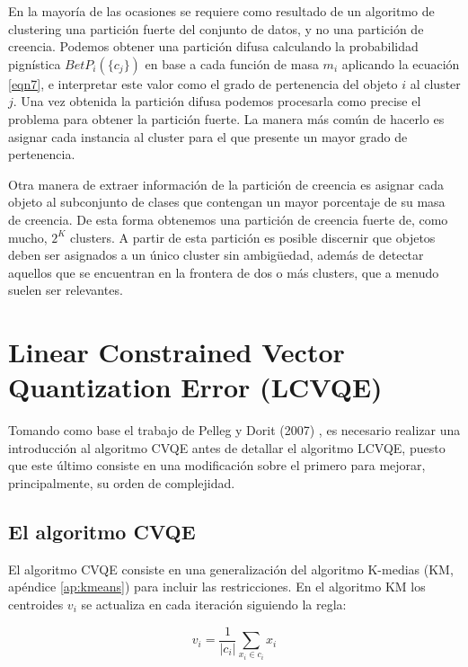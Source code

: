 En la mayoría de las ocasiones se requiere como resultado de un algoritmo de clustering una partición fuerte del conjunto de datos, y no una partición de creencia. Podemos obtener una partición difusa calculando la probabilidad pignística $BetP_i(\{c_j\})$ en base a cada función de masa $m_i$ aplicando la ecuación \ref{eqn7}, e interpretar este valor como el grado de pertenencia del objeto $i$ al cluster $j$. Una vez obtenida la partición difusa podemos procesarla como precise el problema para obtener la partición fuerte. La manera más común de hacerlo es asignar cada instancia al cluster para el que presente un mayor grado de pertenencia.

Otra manera de extraer información de la partición de creencia es asignar cada objeto al subconjunto de clases que contengan un mayor porcentaje de su masa de creencia. De esta forma obtenemos una partición de creencia fuerte de, como mucho, $2^K$ clusters. A partir de esta partición es posible discernir que objetos deben ser asignados a un único cluster sin ambigüedad, además de detectar aquellos que se encuentran en la frontera de dos o más clusters, que a menudo suelen ser relevantes.

\clearpage

\section{Linear Constrained Vector Quantization Error (LCVQE)} \label{lcvqe}

Tomando como base el trabajo de Pelleg y Dorit (2007) \cite{LCVQE:2007}, es necesario realizar una introducción al algoritmo \acf{CVQE} antes de detallar el algoritmo \acs{LCVQE}, puesto que este último consiste en una modificación sobre el primero para mejorar, principalmente, su orden de complejidad.

\subsection{El algoritmo CVQE}

El algoritmo \acs{CVQE} consiste en una generalización del algoritmo K-medias (\acs{KM}, apéndice \ref{ap:kmeans}) para incluir las restricciones. En el algoritmo \acs{KM} los centroides $v_i$ se actualiza en cada iteración siguiendo la regla:

\begin{equation}
v_i = \frac{1}{|c_i|} \sum_{x_i \in c_i} x_i
\label{eqn27}
\end{equation}

